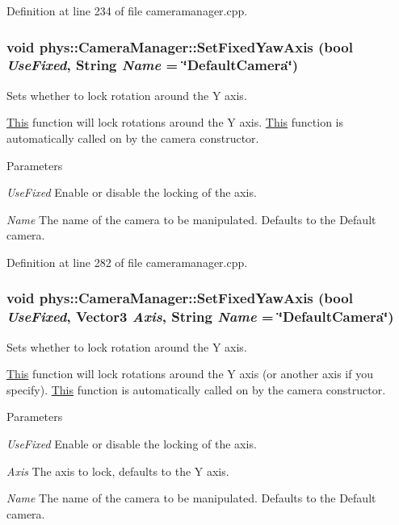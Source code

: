 Definition at line 234 of file cameramanager.cpp.

\hypertarget{classphys_1_1CameraManager_aa7370f2239e88ab151b72c4171afea07}{
\subsubsection[{SetFixedYawAxis}]{\setlength{\rightskip}{0pt plus 5cm}void phys::CameraManager::SetFixedYawAxis (bool {\em UseFixed}, \/  {\bf String} {\em Name} = {\ttfamily \char`\"{}DefaultCamera\char`\"{}})}}
\label{d9/d91/classphys_1_1CameraManager_aa7370f2239e88ab151b72c4171afea07}


Sets whether to lock rotation around the Y axis. 

\hyperlink{structThis}{This} function will lock rotations around the Y axis. \hyperlink{structThis}{This} function is automatically called on by the camera constructor. 
\begin{DoxyParams}{Parameters}
\item[{\em UseFixed}]Enable or disable the locking of the axis. \item[{\em Name}]The name of the camera to be manipulated. Defaults to the Default camera. \end{DoxyParams}


Definition at line 282 of file cameramanager.cpp.

\hypertarget{classphys_1_1CameraManager_ac29a1b3cd34ff2810bee170aa233c77e}{
\subsubsection[{SetFixedYawAxis}]{\setlength{\rightskip}{0pt plus 5cm}void phys::CameraManager::SetFixedYawAxis (bool {\em UseFixed}, \/  {\bf Vector3} {\em Axis}, \/  {\bf String} {\em Name} = {\ttfamily \char`\"{}DefaultCamera\char`\"{}})}}
\label{d9/d91/classphys_1_1CameraManager_ac29a1b3cd34ff2810bee170aa233c77e}


Sets whether to lock rotation around the Y axis. 

\hyperlink{structThis}{This} function will lock rotations around the Y axis (or another axis if you specify). \hyperlink{structThis}{This} function is automatically called on by the camera constructor. 
\begin{DoxyParams}{Parameters}
\item[{\em UseFixed}]Enable or disable the locking of the axis. \item[{\em Axis}]The axis to lock, defaults to the Y axis. \item[{\em Name}]The name of the camera to be manipulated. Defaults to the Default camera. \end{DoxyParams}



